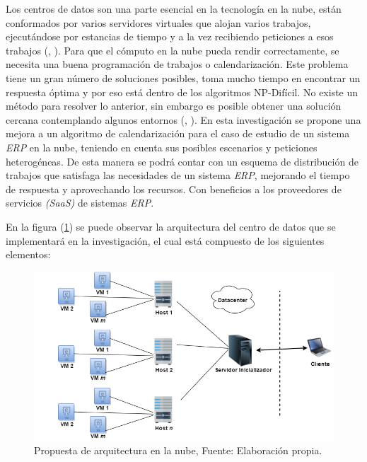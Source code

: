 Los centros de datos son una parte esencial en la tecnolog\'ia en la nube, est\'an conformados por varios servidores virtuales que alojan varios trabajos, ejecut\'andose por estancias de tiempo y a la vez recibiendo peticiones a esos trabajos (\citeauthor{shimpy2014different}, \citeyear{shimpy2014different}).
Para que el c\'omputo en la nube pueda rendir correctamente, se necesita una buena programaci\'on de trabajos o calendarizaci\'on. Este problema tiene un gran n\'umero de soluciones posibles, toma mucho tiempo en encontrar un respuesta \'optima y por eso est\'a dentro de los algoritmos NP-Dif\'icil. No existe un m\'etodo para resolver lo anterior, sin embargo es posible obtener una soluci\'on cercana contemplando algunos entornos (\citeauthor{shimpy2014different}, \citeyear{shimpy2014different}).
En esta investigaci\'on se propone una mejora a un algoritmo de calendarizaci\'on para el caso de estudio de un sistema \textit{ERP} en la nube, teniendo en cuenta sus posibles escenarios y peticiones heterog\'eneas. De esta manera se podr\'a contar con un esquema de distribuci\'on de trabajos que satisfaga las necesidades de un sistema \textit{ERP}, mejorando el tiempo de respuesta y aprovechando los recursos. Con beneficios a los proveedores de servicios \textit{(SaaS)} de sistemas \textit{ERP}.


En la figura (\ref{fig:uno}) se puede observar la arquitectura del centro de datos que se implementar\'a en la investigaci\'on, el cual est\'a compuesto de los siguientes elementos:

\newpage

\setcounter{figure}{0}
\renewcommand\thefigure{\arabic{figure}}
\begin{figure}[h!]
	
	\centering
	\includegraphics[scale=0.5]{media/cloud2}
	\caption{Propuesta de arquitectura en la nube, Fuente: Elaboraci\'on propia.}
	\label{fig:uno}
\end{figure}




